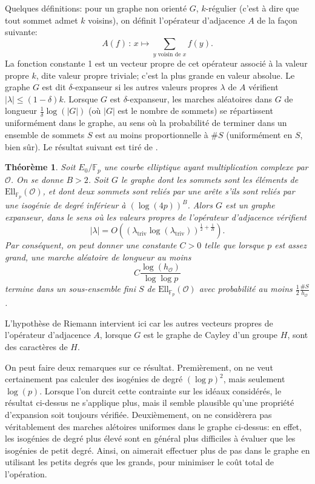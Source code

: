 \documentclass[11pt,a4paper]{article}
\newcommand{\F}{\mathbb{F}}
\renewcommand{\O}{\mathcal{O}}
\newcommand{\Ell}{\mathrm{Ell}}
\newcommand{\de}{\,:\,}
\newtheorem*{thm}{Théorème}
\theoremstyle{definition}
\begin{document}
Quelques définitions: pour un graphe non orienté $G$, $k$-régulier (c'est à dire que tout sommet admet $k$ voisins), on définit l'opérateur d'adjacence $A$ de la façon suivante:
$$A(f)\de x\longmapsto \sum_{y \text{ voisin de } x} f(y).$$
La fonction constante 1 est un vecteur propre de cet opérateur associé à la valeur propre $k$, dite valeur propre triviale; c'est la plus grande en valeur absolue. Le graphe $G$ est dit $\delta$-expanseur si les autres valeurs propres $\lambda$ de $A$ vérifient $|\lambda|\leq (1-\delta) k$. Lorsque $G$ est $\delta$-expanseur, les marches aléatoires dans $G$ de longueur $\frac{1}{\delta} \log(|G|)$ (où $|G|$ est le nombre de sommets) se répartissent uniformément dans le graphe, au sens où la probabilité de terminer dans un ensemble de sommets $S$ est au moins proportionnelle à $\#S$ (uniformément en $S$, bien sûr). Le résultat suivant est tiré de \cite{GRH}.

\begin{thm}
Soit $E_0/\F_p$ une courbe elliptique ayant multiplication complexe par $\O$. On se donne $B>2$. Soit $G$ le graphe dont les sommets sont les éléments de $\Ell_{\F_p}(\O)$, et dont deux sommets sont reliés par une arête s'ils sont reliés par une isogénie de degré inférieur à $(\log(4p))^B$. Alors $G$ est un graphe expanseur, dans le sens où les valeurs propres de l'opérateur d'adjacence vérifient
$$|\lambda| = O\left((\lambda_{\text{triv}} \log(\lambda_{\text{triv}}))^{\frac{1}{2} + \frac{1}{B}}\right).$$
Par conséquent, on peut donner une constante $C>0$ telle que lorsque $p$ est assez grand, une marche aléatoire de longueur au moins
$$C \frac{\log(h_\O)}{\log\log p}$$
termine dans un sous-ensemble fini $S$ de $\Ell_{\F_p}(\O)$ avec probabilité au moins $\frac{1}{2} \frac{\#S}{h_\O}$.
\end{thm}

L'hypothèse de Riemann intervient ici car les autres vecteurs propres de l'opérateur d'adjacence $A$, lorsque $G$ est le graphe de Cayley d'un groupe $H$, sont des caractères de $H$.

On peut faire deux remarques sur ce résultat. Premièrement, on ne veut certainement pas calculer des isogénies de degré $(\log p)^2$, mais seulement $\log(p)$. Lorsque l'on durcit cette contrainte sur les idéaux considérés, le résultat ci-dessus ne s'applique plus, mais il semble plausible qu'une propriété d'expansion soit toujours vérifiée. Deuxièmement, on ne considèrera pas véritablement des marches alétoires uniformes dans le graphe ci-dessus: en effet, les isogénies de degré plus élevé sont en général plus difficiles à évaluer que les isogénies de petit degré. Ainsi, on aimerait effectuer plus de pas dans le graphe en utilisant les petits degrés que les grands, pour minimiser le coût total de l'opération.
\end{document}
